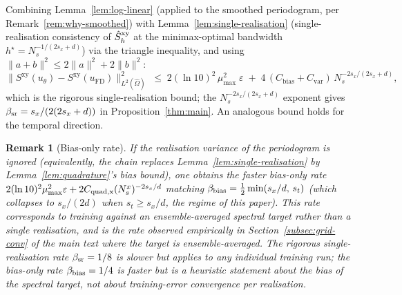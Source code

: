 \documentclass[review,12pt]{elsarticle}
\newtheorem{remark}{Remark}
\begin{document}
Combining Lemma~\ref{lem:log-linear} (applied to the smoothed
periodogram, per Remark~\ref{rem:why-smoothed}) with
Lemma~\ref{lem:single-realisation} (single-realisation consistency
of $\hat S^{\rm xy}_h$ at the minimax-optimal bandwidth
$h^\star = N_s^{-1/(2s_x+d)}$) via the triangle inequality, and
using $\|a+b\|^2 \le 2\|a\|^2 + 2\|b\|^2$:
\begin{equation}
\|S^{\mathrm{xy}}(u_\theta) - S^{\mathrm{xy}}(u_{\mathrm{FD}})
\|^2_{L^2(\widehat\Omega)}
\;\le\; 2(\ln 10)^2\,\mu_{\max}^2\;\varepsilon
\;+\; 4\,(C_{\mathrm{bias}}+C_{\mathrm{var}})\,
N_s^{-2 s_x / (2 s_x + d)},
\label{eq:spectral-l2-bound}
\end{equation}
which is the rigorous single-realisation bound; the $N_s^{-2s_x/(2s_x+d)}$
exponent gives $\beta_{\rm sr} = s_x/(2(2s_x+d))$ in
Proposition~\ref{thm:main}. An analogous bound holds for the
temporal direction.

\begin{remark}[Bias-only rate]
\label{rem:bias-only-rate}
If the realisation variance of the periodogram is ignored
(equivalently, the chain replaces
Lemma~\ref{lem:single-realisation} by Lemma~\ref{lem:quadrature}'s
bias bound), one obtains the faster bias-only rate
$2(\ln 10)^2 \mu_{\max}^2 \varepsilon + 2 C_{\rm quad,x}(N_s^x)^{-2 s_x/d}$
matching $\beta_{\rm bias} = \tfrac12\min(s_x/d,\,s_t)$ (which
collapses to $s_x/(2d)$ when $s_t \ge s_x/d$, the regime of this
paper). This rate corresponds to
training against an ensemble-averaged spectral target rather than a
single realisation, and is the rate observed empirically in
Section~\ref{subsec:grid-conv} of the main text where the target is
ensemble-averaged. The rigorous single-realisation rate
$\beta_{\rm sr} = 1/8$ is slower but applies to any individual
training run; the bias-only rate $\beta_{\rm bias} = 1/4$ is faster
but is a heuristic statement about the bias of the spectral target,
not about training-error convergence per realisation.
\end{remark}
\end{document}
